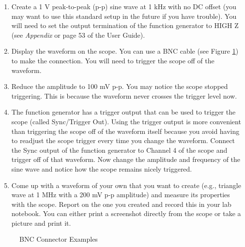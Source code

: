 \documentclass[10pt]{PhysLab1C} %
\begin{document}
\begin{enumerate}
\def\labelenumi{\arabic{enumi}.}
\item
  Create a 1 V peak-to-peak (p-p) sine wave at 1 kHz with no DC offset
  (you may want to use this standard setup in the future if you have
  trouble). You will need to set the output termination of the function
  generator to HIGH Z (see \emph{Appendix} or page 53 of the User
  Guide).
\item
  Display the waveform on the scope. You can use a BNC cable (see Figure 
  \ref{fig:bnc}) to make the connection. You will need to trigger the scope off of
  the waveform.
\item
  Reduce the amplitude to 100 mV p-p. You may notice the scope stopped
  triggering. This is because the waveform never crosses the trigger
  level now.
\item
  The function generator has a trigger output that can be used to
  trigger the scope (called Sync/Trigger Out). Using the trigger output
  is more convenient than triggering the scope off of the waveform
  itself because you avoid having to readjust the scope trigger every
  time you change the waveform. Connect the Sync output of the function
  generator to Channel 4 of the scope and trigger off of that waveform.
  Now change the amplitude and frequency of the sine wave and notice how
  the scope remains nicely triggered.
\item
  Come up with a waveform of your own that you want to create (e.g.,
  triangle wave at 1 MHz with a 200 mV p-p amplitude) and measure its
  properties with the scope. Report on the one you created and record
  this in your lab notebook. You can either print a screenshot directly
  from the scope or take a picture and print it.
\end{enumerate}

\begin{figure}%
    \centering
    \qquad
    \caption{BNC Connector Examples}%
    \label{fig:bnc}%
\end{figure}
\end{document}
